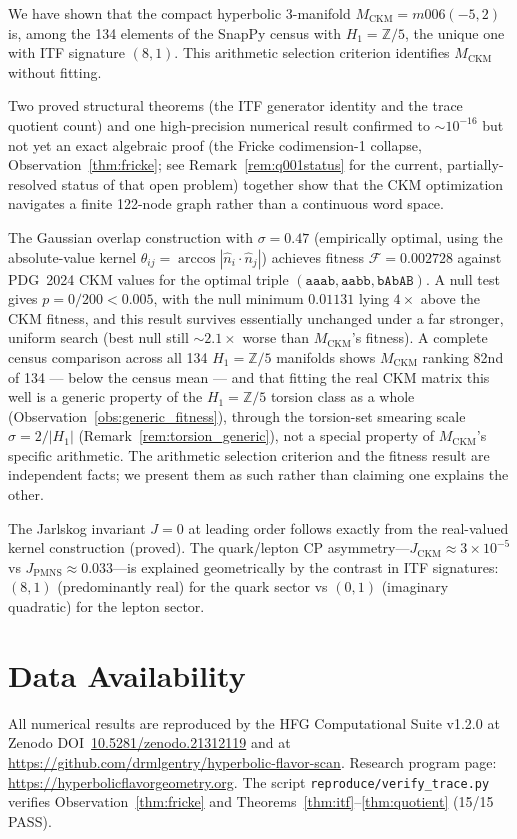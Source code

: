 \documentclass[11pt,a4paper]{article}
\theoremstyle{remark}
\newcommand{\MCKM}{M_{\mathrm{CKM}}}
\newcommand{\Zfive}{\mathbb{Z}/5}
\begin{document}
We have shown that the compact hyperbolic 3-manifold
$\MCKM = m006(-5,2)$ is, among the 134 elements of the SnapPy census with
$H_1 = \Zfive$, the unique one with ITF signature $(8,1)$.
This arithmetic selection criterion identifies $\MCKM$ without fitting.

Two proved structural theorems (the ITF generator identity and the trace
quotient count) and one high-precision numerical result confirmed to
$\sim 10^{-16}$ but not yet an exact algebraic proof (the Fricke
codimension-1 collapse, Observation~\ref{thm:fricke}; see
Remark~\ref{rem:q001status} for the current, partially-resolved status of
that open problem) together show that the CKM optimization navigates a
finite 122-node graph rather than a continuous word space.

The Gaussian overlap construction with $\sigma = 0.47$
(empirically optimal, using the absolute-value kernel
$\theta_{ij} = \arccos|\hat{n}_i \cdot \hat{n}_j|$)
achieves fitness $\mathcal{F} = 0.002728$ against PDG~2024 CKM values
for the optimal triple $(\mathtt{aaab}, \mathtt{aabb}, \mathtt{bAbAB})$.
A null test gives $p = 0/200 < 0.005$, with the null minimum
$0.01131$ lying $4\times$ above the CKM fitness, and this result survives
essentially unchanged under a far stronger, uniform search (best null
still $\sim 2.1\times$ worse than $\MCKM$'s fitness).
A complete census comparison across all 134 $H_1 = \Zfive$ manifolds shows
$\MCKM$ ranking 82nd of 134 --- below the census mean --- and that fitting
the real CKM matrix this well is a generic property of the $H_1 = \Zfive$
torsion class as a whole (Observation~\ref{obs:generic_fitness}), through
the torsion-set smearing scale $\sigma = 2/|H_1|$
(Remark~\ref{rem:torsion_generic}), not a special property of $\MCKM$'s
specific arithmetic. The arithmetic selection criterion and the fitness
result are independent facts; we present them as such rather than
claiming one explains the other.

The Jarlskog invariant $J = 0$ at leading order follows exactly from
the real-valued kernel construction (proved).
The quark/lepton CP asymmetry---$J_\mathrm{CKM} \approx 3 \times 10^{-5}$
vs $J_\mathrm{PMNS} \approx 0.033$---is explained geometrically
by the contrast in ITF signatures: $(8,1)$ (predominantly real) for
the quark sector vs $(0,1)$ (imaginary quadratic) for the lepton sector.

\section*{Data Availability}
All numerical results are reproduced by the HFG Computational Suite v1.2.0
at Zenodo DOI~\href{https://doi.org/10.5281/zenodo.21312119}{10.5281/zenodo.21312119}
and at \url{https://github.com/drmlgentry/hyperbolic-flavor-scan}.
Research program page: \url{https://hyperbolicflavorgeometry.org}.
The script \texttt{reproduce/verify\_trace.py} verifies
Observation~\ref{thm:fricke} and Theorems~\ref{thm:itf}--\ref{thm:quotient}
(15/15 PASS).
\end{document}
